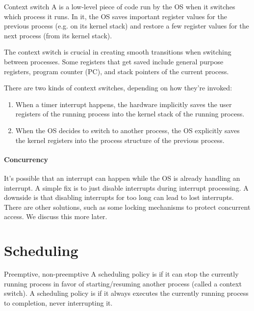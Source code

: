 \begin{dfnbox}{Context switch}{}
    A  is a low-level piece of code run by the OS when it switches which process it runs. In it, the OS saves important register values for the previous process (e.g. on its kernel stack) and restore a few register values for the next process (from its kernel stack).
\end{dfnbox}

The context switch is crucial in creating smooth transitions when switching between processes. Some registers that get saved include general purpose registers, program counter (PC), and stack pointers of the current process.

There are two kinds of context switches, depending on how they're invoked:
\begin{enumerate}[label=\textbf{\Alph*.}]
    \item When a timer interrupt happens, the hardware implicitly saves the user registers of the running process into the kernel stack of the running process.
    \item When the OS decides to switch to another process, the OS explicitly saves the kernel registers into the process structure of the previous process.
\end{enumerate}

\paragraph{Concurrency}
It's possible that an interrupt can happen while the OS is already handling an interrupt. A simple fix is to just disable interrupts during interrupt processing. A downside is that disabling interrupts for too long can lead to lost interrupts. There are other solutions, such as some locking mechanisms to protect concurrent access. We discuss this more later.

\section{Scheduling}

\begin{dfnbox}{Preemptive, non-preemptive}{}
    A scheduling policy is  if it can stop the currently running process in favor of starting/resuming another process (called a context switch). A scheduling policy is  if it always executes the currently running process to completion, never interrupting it.
\end{dfnbox}

